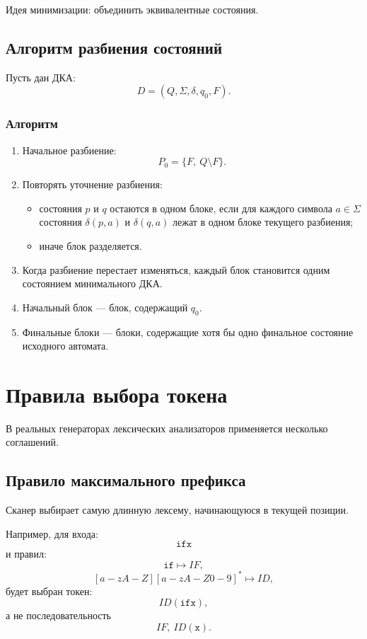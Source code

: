 \documentclass[12pt,a4paper]{article}
\begin{document}
Идея минимизации: объединить эквивалентные состояния.

\subsection{Алгоритм разбиения состояний}

Пусть дан ДКА:
\[
D=(Q,\Sigma,\delta,q_0,F).
\]

\subsubsection*{Алгоритм}

\begin{enumerate}
    \item Начальное разбиение:
    \[
    P_0 = \{F,\ Q\setminus F\}.
    \]
    \item Повторять уточнение разбиения:
    \begin{itemize}
        \item состояния $p$ и $q$ остаются в одном блоке, если для каждого символа $a \in \Sigma$ состояния $\delta(p,a)$ и $\delta(q,a)$ лежат в одном блоке текущего разбиения;
        \item иначе блок разделяется.
    \end{itemize}
    \item Когда разбиение перестает изменяться, каждый блок становится одним состоянием минимального ДКА.
    \item Начальный блок --- блок, содержащий $q_0$.
    \item Финальные блоки --- блоки, содержащие хотя бы одно финальное состояние исходного автомата.
\end{enumerate}

\section{Правила выбора токена}

В реальных генераторах лексических анализаторов применяется несколько соглашений.

\subsection{Правило максимального префикса}

Сканер выбирает самую длинную лексему, начинающуюся в текущей позиции.

Например, для входа:
\[
\texttt{ifx}
\]
и правил:
\[
\texttt{if} \mapsto IF,
\]
\[
[a-zA-Z][a-zA-Z0-9]^* \mapsto ID,
\]
будет выбран токен:
\[
ID(\texttt{ifx}),
\]
а не последовательность
\[
IF,\ ID(\texttt{x}).
\]
\end{document}
